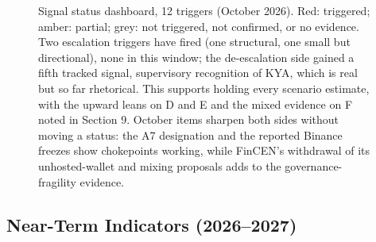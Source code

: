\documentclass[11pt,letterpaper]{article}
\begin{document}
\begin{figure}[htbp]
\caption{Signal status dashboard, 12 triggers (October 2026). Red: triggered; amber: partial; grey: not triggered, not confirmed, or no evidence. Two escalation triggers have fired (one structural, one small but directional), none in this window; the de-escalation side gained a fifth tracked signal, supervisory recognition of KYA, which is real but so far rhetorical. This supports holding every scenario estimate, with the upward leans on D and E and the mixed evidence on F noted in Section 9. October items sharpen both sides without moving a status: the A7 designation and the reported Binance freezes show chokepoints working, while FinCEN's withdrawal of its unhosted-wallet and mixing proposals adds to the governance-fragility evidence.}
\label{fig:dashboard}
\end{figure}

\subsection{Near-Term Indicators (2026--2027)}
\end{document}
